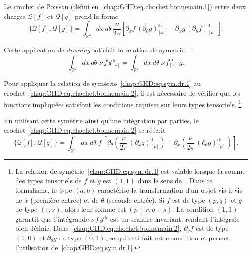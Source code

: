 \medskip


Le crochet de Poisson (défini en~\eqref{chap:GHD:eq.chochet.bonnemain.1}) entre deux charges $\mathcal{Q}[f]$ et $\mathcal{Q}[g]$ prend la forme
\begin{equation}\label{chap:GHD:eq.chochet.bonnemain.2}
	\{\mathcal{Q}[f], \mathcal{Q}[g]\}
	= \int_{\mathbb{R}^2} dx\, d\theta\, \frac{\nu}{2\pi} 
	\left[ \partial_x f \, (\partial_\theta g)^{\mathrm{dr}}_{[\nu]} 
	     - \partial_x g \, (\partial_\theta f)^{\mathrm{dr}}_{[\nu]} \right].
\end{equation}

\medskip

Cette application de \emph{dressing} satisfait la relation de symétrie~\cite{doyon2020lecture} :
\begin{equation}\label{chap:GHD:eq.sym.dr.1}
	\int_{\mathbb{R}^2} dx\, d\theta \; \nu \, f \, g^{\mathrm{dr}}_{[\nu]} 
	= \int_{\mathbb{R}^2} dx\, d\theta \; \nu \, f^{\mathrm{dr}}_{[\nu]} \, g.
\end{equation}

Pour appliquer la relation de symétrie~\eqref{chap:GHD:eq.sym.dr.1} au crochet~\eqref{chap:GHD:eq.chochet.bonnemain.2}, il est nécessaire de vérifier que les fonctions impliquées satisfont les conditions requises sur leurs types tensoriels.
\footnote{
La relation de symétrie~\eqref{chap:GHD:eq.sym.dr.1} est valable lorsque la somme des types tensoriels de $f$ et $g$ est $(1,1)$ dans le sens de~\cite{doyon2020lecture}. Dans ce formalisme, le type $(a,b)$ caractérise la transformation d'un objet vis-à-vis de $x$ (première entrée) et de $\theta$ (seconde entrée). Si $f$ est de type $(p,q)$ et $g$ de type $(r,s)$, alors leur somme est $(p+r,q+s)$. La condition $(1,1)$ garantit que l'intégrande $\nu\, f\, g^{\mathrm{dr}}$ est un scalaire invariant, rendant l'intégrale bien définie. Dans~\eqref{chap:GHD:eq.chochet.bonnemain.2}, $\partial_x f$ est de type $(1,0)$ et $\partial_\theta g$ de type $(0,1)$, ce qui satisfait cette condition et permet l'utilisation de~\eqref{chap:GHD:eq.sym.dr.1}.
}

En utilisant cette symétrie ainsi qu’une intégration par parties, le crochet~\eqref{chap:GHD:eq.chochet.bonnemain.2} se réécrit
\begin{equation}\label{chap:GHD:eq.chochet.bonnemain.3}
	\{\mathcal{Q}[f], \mathcal{Q}[g]\}
	= \int_{\mathbb{R}^2} dx\, d\theta \; f \,
	\left[
		\partial_\theta \left( \frac{\nu}{2\pi} \, (\partial_x g)^{\mathrm{dr}}_{[\nu]} \right)
		- \partial_x \left( \frac{\nu}{2\pi} \, (\partial_\theta g)^{\mathrm{dr}}_{[\nu]} \right)
	\right].
\end{equation}

